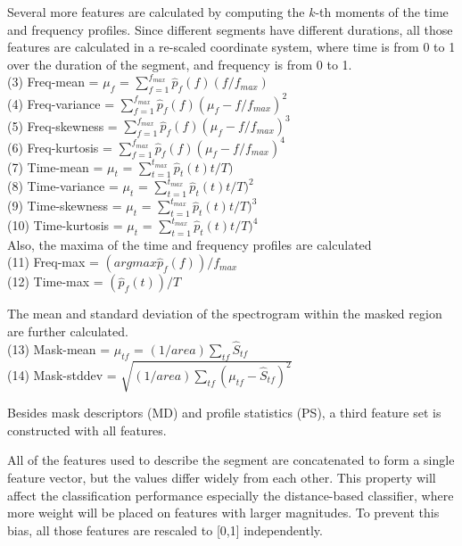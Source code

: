 Several more features are calculated by computing the $k$-th moments of the time and frequency profiles. Since different segments have different durations, all those features are calculated in a re-scaled coordinate system, where time is from 0 to 1 over the duration of the segment, and frequency is from 0 to 1.
\\
(3) Freq-mean = $\mu_{f}$ = $\sum_{f=1}^{f_{max}}\hat{p}_{f}(f)(f/f_{max})$
\\
(4) Freq-variance = $\sum_{f=1}^{f_{max}}\hat{p}_{f}(f)(\mu_{f}-f/f_{max})^{2}$
\\
(5) Freq-skewness = $\sum_{f=1}^{f_{max}}\hat{p}_{f}(f)(\mu_{f}-f/f_{max})^{3}$
\\
(6) Freq-kurtosis = $\sum_{f=1}^{f_{max}}\hat{p}_{f}(f)(\mu_{f}-f/f_{max})^{4}$
\\
(7) Time-mean =  $\mu_{t}$ = $\sum_{t=1}^{t_{max}}\hat{p}_{t}(t)t/T)$
\\
(8) Time-variance = $\mu_{t}$ = $\sum_{t=1}^{t_{max}}\hat{p}_{t}(t)t/T)^{2}$
\\
(9) Time-skewness = $\mu_{t}$ = $\sum_{t=1}^{t_{max}}\hat{p}_{t}(t)t/T)^{3}$
\\
(10) Time-kurtosis = $\mu_{t}$ = $\sum_{t=1}^{t_{max}}\hat{p}_{t}(t)t/T)^{4}$
\\
Also, the maxima of the time and frequency profiles are calculated
\\
(11) Freq-max = $(argmax \hat{p}_{f}(f)) / f_{max}$
\\
(12) Time-max = $(\hat{p}_{f}(t)) / T$

The mean and standard deviation of the spectrogram within the masked region are further calculated.
\\
(13) Mask-mean = $\mu_{tf}$ = $(1/area) \sum_{tf}\hat{S}_{tf}$
\\
(14) Mask-stddev = $\sqrt{(1/area) \sum_{tf}(\mu_{tf}-\hat{S}_{tf})^{2}}$


Besides mask descriptors (MD) and profile statistics (PS), a third feature set is constructed with all features.

All of the features used to describe the segment are concatenated to form a single feature vector, but the values differ widely from each other. This property will affect the classification performance especially the distance-based classifier, where more weight will be placed on features with larger magnitudes. To prevent this bias, all those features are rescaled to [0,1] independently.



